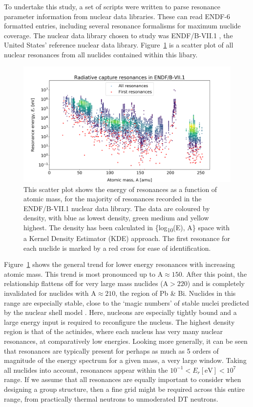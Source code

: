 To undertake this study, a set of scripts were written to parse resonance parameter information from nuclear data libraries. These can read ENDF-6 formatted entries, including several resonance formalisms for maximum nuclide coverage. The nuclear data library chosen to study was ENDF/B-VII.1 \cite{Chadwick2011}, the United States' reference nuclear data library. Figure~\ref{fig:res_energy_mass} is a scatter plot of all nuclear resonances from all nuclides contained within this libary. 

\begin{figure}[H]
  \centering
  \includegraphics[width=\linewidth]{resonance_energy_atomic_mass}
  \caption{This scatter plot shows the energy of resonances as a function of atomic mass, for the majority of resonances recorded in the ENDF/B-VII.1 nuclear data library. The data are coloured by density, with blue as lowest density, green medium and yellow highest. The density has been calculated in \{log\textsubscript{10}(E), A\} space with a Kernel Density Estimator (KDE) approach. The first resonance for each nuclide is marked by a red cross for ease of identification.}
  \label{fig:res_energy_mass}
\end{figure}

Figure~\ref{fig:res_energy_mass} shows the general trend for lower energy resonances with increasing atomic mass. This trend is most pronounced up to $\mathrm{A} \approx 150$. After this point, the relationship flattens off for very large mass nuclides ($\mathrm{A} > 220$) and is completely invalidated for nuclides with $\mathrm{A} \approx 210$, the region of Pb \& Bi. Nuclides in this range are especially stable, close to the `magic numbers' of stable nuclei predicted by the nuclear shell model \cite{Stone1997}. Here, nucleons are especially tightly bound and a large energy input is required to reconfigure the nucleus. The highest density region is that of the actinides, where each nucleus has very many nuclear resonances, at comparatively low energies. Looking more generally, it can be seen that resonances are typically present for perhaps as much as 5 orders of magnitude of the energy spectrum for a given mass, a very large window. Taking all nuclides into account, resonances appear within the $10^{-1} < E_{r}\mathrm{[eV]} < 10^{7}$ range. If we assume that all resonances are equally important to consider when designing a group structure, then a fine grid might be required across this entire range, from practically thermal neutrons to unmoderated DT neutrons. 

